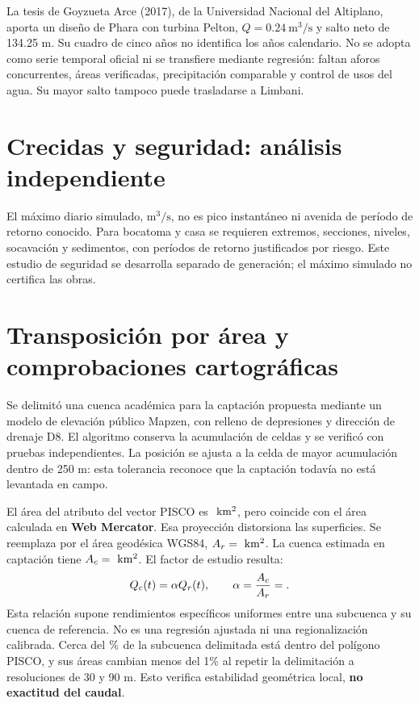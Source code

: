 La tesis de Goyzueta Arce (2017), de la Universidad Nacional del Altiplano, aporta un diseño de Phara con turbina Pelton, \(Q=0.24\ \mathrm{m^3/s}\) y salto neto de 134.25 m. Su cuadro de cinco años no identifica los años calendario. No se adopta como serie temporal oficial ni se transfiere mediante regresión: faltan aforos concurrentes, áreas verificadas, precipitación comparable y control de usos del agua. Su mayor salto tampoco puede trasladarse a Limbani.

\section{Crecidas y seguridad: análisis independiente}
El máximo diario simulado,  \(\mathrm{m^3/s}\), no es pico instantáneo ni avenida de período de retorno conocido. Para bocatoma y casa se requieren extremos, secciones, niveles, socavación y sedimentos, con períodos de retorno justificados por riesgo. Este estudio de seguridad se desarrolla separado de generación; el máximo simulado no certifica las obras.

\section{Transposición por área y comprobaciones cartográficas}
Se delimitó una cuenca académica para la captación propuesta mediante un modelo de elevación público Mapzen, con relleno de depresiones y dirección de drenaje D8. El algoritmo conserva la acumulación de celdas y se verificó con pruebas independientes. La posición se ajusta a la celda de mayor acumulación dentro de 250 m: esta tolerancia reconoce que la captación todavía no está levantada en campo.

El área del atributo del vector PISCO es \(\dato{Amerc}\ \mathrm{km^2}\), pero coincide con el área calculada en \textbf{Web Mercator}. Esa proyección distorsiona las superficies. Se reemplaza por el área geodésica WGS84, \(A_r=\dato{Aref}\ \mathrm{km^2}\). La cuenca estimada en captación tiene \(A_c=\dato{Acapt}\ \mathrm{km^2}\). El factor de estudio resulta:
\begin{equation}
 Q_c(t)=\alpha Q_r(t),\qquad \alpha=\frac{A_c}{A_r}=\dato{Alpha}.
\end{equation}
Esta relación supone rendimientos específicos uniformes entre una subcuenca y su cuenca de referencia. No es una regresión ajustada ni una regionalización calibrada. Cerca del \(\dato{NestedPct}\%\) de la subcuenca delimitada está dentro del polígono PISCO, y sus áreas cambian menos del 1\% al repetir la delimitación a resoluciones de 30 y 90 m. Esto verifica estabilidad geométrica local, \textbf{no exactitud del caudal}.

